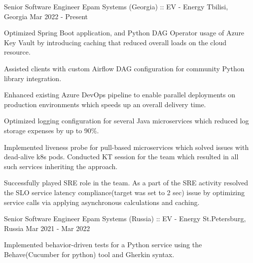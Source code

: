 

\begin{cventries}

  \cventry
    {Senior Software Engineer} %
    {Epam Systems (Georgia) :: EV - Energy} %
    {Tbilisi, Georgia} %
    {Mar 2022 - Present} %
    {
      \begin{cvitems} %
        \item {Optimized Spring Boot application, and Python DAG Operator usage of Azure Key Vault by introducing caching that reduced overall loads on the cloud resource.}
        \item {Assisted clients with custom Airflow DAG configuration for community Python library integration.}
        \item {Enhanced existing Azure DevOps pipeline to enable parallel deployments on production environments which speeds up an overall delivery time.}
        \item {Optimized logging configuration for several Java microservices which reduced log storage expenses by up to 90\%.}
        \item {Implemented liveness probe for pull-based microservices which solved issues with dead-alive k8s pods. 
        Conducted KT session for the team which resulted in all such services inheriting the approach.}
        \item {Successfully played SRE role in the team. As a part of the SRE activity resolved the SLO service latency compliance(target was set to 2 sec) 
        issue by optimizing service calls via applying asynchronous calculations and caching.}
      \end{cvitems}
    }
\cventry
{Senior Software Engineer} %
{Epam Systems (Russia) ::  EV - Energy} %
{St.Petersburg, Russia} %
{Mar 2021 - Mar 2022} %
{
  \begin{cvitems} %
    \item {Implemented behavior-driven tests for a Python service using the Behave(Cucumber for python) tool and Gherkin syntax.}

\end{cvitems}}
\end{cventries}
